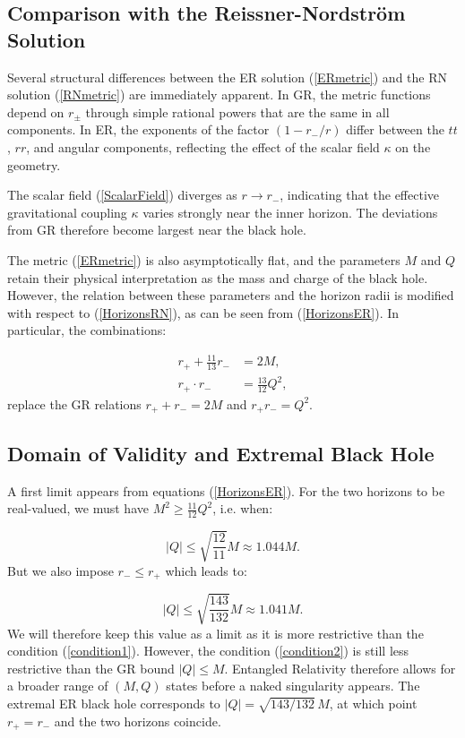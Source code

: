 \documentclass[floats,floatfix,aps, preprintnumbers,nofootinbib]{revtex4-2}
\begin{document}
\subsection{Comparison with the Reissner-Nordström Solution}

Several structural differences between the ER solution (\ref{ERmetric}) and the RN solution (\ref{RNmetric}) are immediately apparent. In GR, the metric functions depend on $r_\pm$ through simple rational powers that are the same in all components. In ER, the exponents of the factor $(1 - r_-/r)$ differ between the $tt$, $rr$, and angular components, reflecting the effect of the scalar field $\kappa$ on the geometry.

The scalar field (\ref{ScalarField}) diverges as $r \to r_-$, indicating that the effective gravitational coupling $\kappa$ varies strongly near the inner horizon. The deviations from GR therefore become largest near the black hole.

The metric (\ref{ERmetric}) is also asymptotically flat, and the parameters $M$ and $Q$ retain their physical interpretation as the mass and charge of the black hole. However, the relation between these parameters and the horizon radii is modified with respect to (\ref{HorizonsRN}), as can be seen from (\ref{HorizonsER}). In particular, the combinations:

\begin{align*}
    r_+ + \frac{11}{13}r_- &= 2M, \\
    r_+ \cdot r_- &= \frac{13}{12}Q^2,
\end{align*}
replace the GR relations $r_+ + r_- = 2M$ and $r_+ r_- = Q^2$.

\subsection{Domain of Validity and Extremal Black Hole}

A first limit appears from equations (\ref{HorizonsER}). For the two horizons to be real-valued, we must have $M^2 \geq \frac{11}{12}Q^2$, i.e. when:

\begin{equation}\label{condition1}
    |Q| \leq \sqrt{\frac{12}{11}}M \approx 1.044 M.
\end{equation}
But we also impose $r_- \leq r_+$ which leads to:

\begin{equation}\label{condition2}
    |Q| \leq \sqrt{\frac{143}{132}}M \approx 1.041 M.
\end{equation}
We will therefore keep this value as a limit as it is more restrictive than the condition (\ref{condition1}). However, the condition (\ref{condition2}) is still less restrictive than the GR bound $|Q| \leq M$. Entangled Relativity therefore allows for a broader range of $(M, Q)$ states before a naked singularity appears. The extremal ER black hole corresponds to $|Q| = \sqrt{143/132}\,M$, at which point $r_+ = r_-$ and the two horizons coincide.
\end{document}
